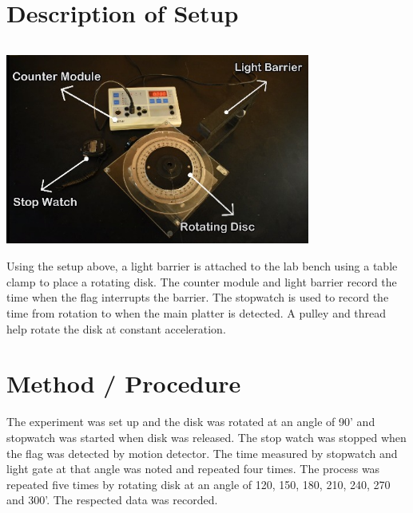 \section{Description of Setup}
\includegraphics[width=10cm, height=7cm]{figures/exp6fig.jpeg} \\
Using the setup above, a light barrier is attached to the lab bench using a table clamp to place a rotating disk. The counter module and light barrier record the time when the flag interrupts the barrier. The stopwatch is used to record the time from rotation to when the main platter is detected. A pulley and thread help rotate the disk at constant acceleration. 


\section{Method / Procedure}

The experiment was set up and the disk was rotated at an angle of 90' and stopwatch was started when disk was released. The stop watch was stopped when the flag was detected by motion detector. 
The time measured by stopwatch and light gate at that angle was noted and repeated four times. 
The process was repeated five times by rotating disk at an angle of 120, 150, 180, 210, 240, 270 and 300'.
The respected data was recorded. 


